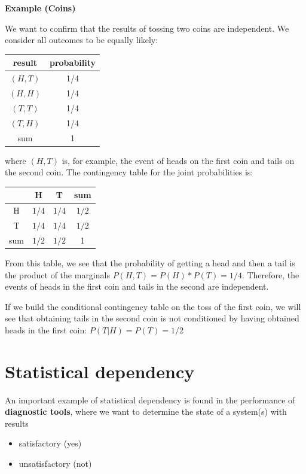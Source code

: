 \documentclass[
]{book}
\providecommand{\tightlist}{%
  \setlength{\itemsep}{0pt}\setlength{\parskip}{0pt}}
\begin{document}
\textbf{Example (Coins)}

We want to confirm that the results of tossing two coins are independent. We consider all outcomes to be equally likely:

\begin{longtable}[]{@{}cc@{}}
\toprule
result & probability \\
\midrule
\endhead
\(( H,T )\) & 1/4 \\
\(( H,H )\) & 1/4 \\
\(( T,T )\) & 1/4 \\
\(( T, H )\) & 1/4 \\
sum & 1 \\
\bottomrule
\end{longtable}

where \(( H,T )\) is, for example, the event of heads on the first coin and tails on the second coin. The contingency table for the joint probabilities is:

\begin{longtable}[]{@{}cccc@{}}
\toprule
& H & T & sum \\
\midrule
\endhead
H & \(1/4\) & \(1/4\) & \(1/2\) \\
T & \(1/4\) & \(1/4\) & \(1/2\) \\
sum & \(1/2\) & \(1/2\) & 1 \\
\bottomrule
\end{longtable}

From this table, we see that the probability of getting a head and then a tail is the product of the marginals \(P( H, T)=P(H)*P(T)=1/4\). Therefore, the events of heads in the first coin and tails in the second are independent.

If we build the conditional contingency table on the toss of the first coin, we will see that obtaining tails in the second coin is not conditioned by having obtained heads in the first coin: \(P(T| H)= P(T) =1 / 2\)

\hypertarget{statistical-dependency}{%
\section{Statistical dependency}\label{statistical-dependency}}

An important example of statistical dependency is found in the performance of \textbf{diagnostic tools}, where we want to determine the state of a system(s) with results

\begin{itemize}
\tightlist
\item
  satisfactory (yes)
\item
  unsatisfactory (not)
\end{itemize}
\end{document}
